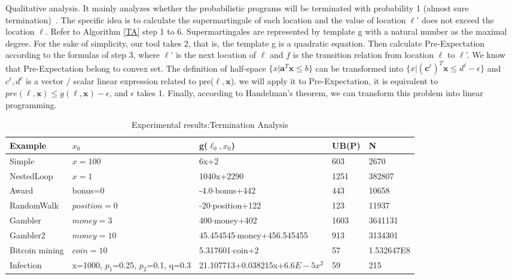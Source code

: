 Qualitative analysis. It mainly analyzes whether the probabilistic programs will be terminated with probability 1 (almost sure termination)~\cite{Hurd2002A}. The specific idea is to calculate the supermartingale of each location and the value of location $\ell$' does not exceed the location $\ell$. Refer to Algorithm \ref{TA} step 1 to 6. Supermartingales are represented by template g with a natural number as the maximal degree. For the sake of simplicity, our tool takes 2, that is, the template g is a quadratic equation. Then calculate Pre-Expectation according to the formulas of step 3, where $\ell$' is the next location of $\ell$ and $f$ is the transition relation from location $\ell$ to $\ell$'. We know that Pre-Expectation belong to convex set. The definition of half-space $\{x|\textbf{a}^T\textbf{x}\leq b\}$ can be transformed into $\{x|(\textbf{c}^\ell)^T\textbf{x} \leq d^\ell-\epsilon\}$ and $c^\ell,d^\ell$ is a vector / scalar linear expression related to pre($\ell,\boldsymbol{x}$). we will apply it to Pre-Expectation, it is equivalent to $pre(\ell,\boldsymbol{x}) \leq g(\ell,\boldsymbol{x})-\epsilon$, and $\epsilon$ takes 1. Finally, according to Handelman's theorem, we can transform this problem into linear programming.

\begin{table*}[pt] 
	\caption{Experimental results:Termination Analysis}  
	\label{TerminationResult} 
	\begin{center}  
		\begin{tabular}{|l|l|l|l|l|}  
			\hline  	
			Example & $x_0$ & g($\ell_0,x_0$) & UB(P) & N\\ \hline  	
			Simple & $x=100$  & 6x+2 & 603 & 2670 \\ \hline  		
			NestedLoop & $x=1$ & 1040x+2290 & 1251 & 382807 \\  \hline  
			Award & bonus=0 & -4.0$\cdot$bonus+442& 443 &10658 \\  \hline  
			RandomWalk & $position=0$ & -20$\cdot$position+122 & 123 & 11937 \\  \hline  
			Gambler& $money=3$ & 400$\cdot$money+402& 1603 & 3641131 \\ \hline  		 
			Gambler2 & $money=10$ & 45.454545$\cdot$money+456.545455 & 913 & 3134301 \\  \hline  
			Bitcoin mining & $coin=10$ & 5.317601$\cdot$coin+2 & 57 & 1.532647E8 \\  \hline 
			Infection & x=1000, $p_1$=0.25, $p_2$=0.1, q=0.3 & 21.107713+0.038215x+$6.6E-5x^2$& 59 & 215 \\  \hline  
		\end{tabular}  
	\end{center}  
\end{table*}

